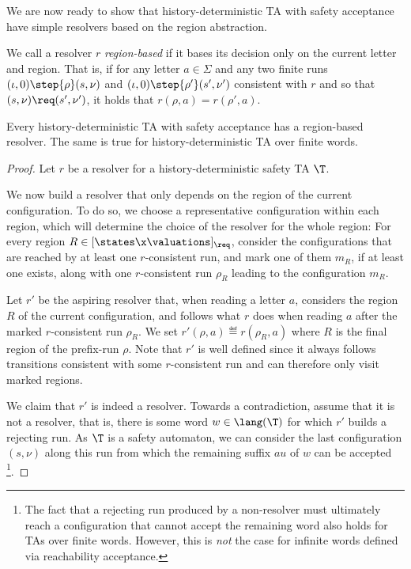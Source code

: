 We are now ready to show that history-deterministic TA with safety acceptance have simple resolvers based on the region abstraction.

We call a resolver $r$
\emph{region-based} if it
bases its decision only on the current letter and region.
That is, 
if for any letter $a\in\Sigma$
and any two finite runs $(\iota,0)\step{\rho}(s,\nu)$ and $(\iota,0)\step{\rho'}(s',\nu')$
consistent with $r$ and so that $(s,\nu)\req(s',\nu')$,
it holds that $r(\rho,a)=r(\rho',a)$.
 
 \begin{lemma}
     \label{lem:region-resolver}
     Every history-deterministic TA with safety acceptance has a region-based resolver.
     The same is true for history-deterministic TA over finite words.
\end{lemma}
\begin{proof}
Let $r$ be a resolver for a history-deterministic safety TA $\T$. %

We now build a resolver that only depends on the region of the current configuration. To do so, we choose a representative configuration within each region, which will determine the choice of the resolver for the whole region:
For every region $R\in [\states\x\valuations]_\req$, consider the configurations that are reached by at least one $r$-consistent run, and mark one of them $m_R$, if at least one exists, along with one $r$-consistent run $\rho_R$ leading to the configuration $m_R$.
 
  Let $r'$ be the aspiring resolver that, when reading a letter $a$, considers the region $R$ of the current configuration, and  follows what $r$ does when reading $a$ after the marked $r$-consistent run $\rho_R$.
  We set $r'(\rho,a)\eqdef r(\rho_R,a)$ where $R$ is the final region of the prefix-run $\rho$. 
  Note that $r'$ is well defined since it always follows transitions consistent with some $r$-consistent run
  and can therefore only visit marked regions.

We claim that $r'$ is indeed a resolver. Towards a contradiction, assume that it is not a resolver, that is, there is some word $w\in \lang(\T)$ for which $r'$ builds a rejecting run.
As $\T$ is a safety automaton, we can consider the last configuration $(s,\nu)$ along this run from which the remaining suffix $au$ of $w$ can be accepted
\footnote{
The fact that a rejecting run produced by a non-resolver must ultimately
reach a configuration that cannot accept the remaining word
also holds for TAs over finite words.
However, this is \emph{not} the case for infinite words defined via reachability acceptance.
}.



\end{proof}
